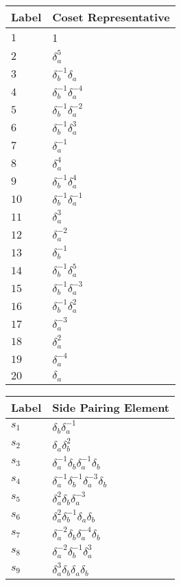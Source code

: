 \documentclass{article}
\begin{document}
\begin{center}
\begin{tabular}{ll}
\toprule
Label & Coset Representative\\
\midrule
$1$ & 1 \\
$2$ & $\delta_a^{5}$ \\
$3$ & $\delta_b^{-1}\delta_a^{}$ \\
$4$ & $\delta_b^{-1}\delta_a^{-4}$ \\
$5$ & $\delta_b^{-1}\delta_a^{-2}$ \\
$6$ & $\delta_b^{-1}\delta_a^{3}$ \\
$7$ & $\delta_a^{-1}$ \\
$8$ & $\delta_a^{4}$ \\
$9$ & $\delta_b^{-1}\delta_a^{4}$ \\
$10$ & $\delta_b^{-1}\delta_a^{-1}$ \\
$11$ & $\delta_a^{3}$ \\
$12$ & $\delta_a^{-2}$ \\
$13$ & $\delta_b^{-1}$ \\
$14$ & $\delta_b^{-1}\delta_a^{5}$ \\
$15$ & $\delta_b^{-1}\delta_a^{-3}$ \\
$16$ & $\delta_b^{-1}\delta_a^{2}$ \\
$17$ & $\delta_a^{-3}$ \\
$18$ & $\delta_a^{2}$ \\
$19$ & $\delta_a^{-4}$ \\
$20$ & $\delta_a^{}$ \\
\bottomrule
\end{tabular}
\hfill
\begin{tabular}{ll}
\toprule
Label & Side Pairing Element\\
\midrule
$s_{1}$ & $\delta_b^{}\delta_a^{-1}$ \\
$s_{2}$ & $\delta_a^{}\delta_b^{2}$ \\
$s_{3}$ & $\delta_a^{-1}\delta_b^{}\delta_a^{-1}\delta_b^{}$ \\
$s_{4}$ & $\delta_a^{-1}\delta_b^{-1}\delta_a^{-3}\delta_b^{}$ \\
$s_{5}$ & $\delta_a^{2}\delta_b^{}\delta_a^{-3}$ \\
$s_{6}$ & $\delta_a^{2}\delta_b^{-1}\delta_a^{}\delta_b^{}$ \\
$s_{7}$ & $\delta_a^{-2}\delta_b^{}\delta_a^{-4}\delta_b^{}$ \\
$s_{8}$ & $\delta_a^{-2}\delta_b^{-1}\delta_a^{3}$ \\
$s_{9}$ & $\delta_a^{3}\delta_b^{}\delta_a^{}\delta_b^{}$ \\

\end{tabular}
\end{center}
\end{document}
